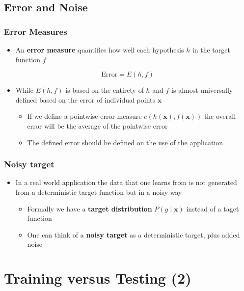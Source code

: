 \documentclass[11pt]{article}
\begin{document}
\subsection{Error and Noise}
\label{sec:orga93b44f}
\subsubsection{Error Measures}
\label{sec:orgdc1635f}
\begin{itemize}
\item An \textbf{error measure} quantifies how well each hypothesis \(h\) in the target function \(f\)
\end{itemize}
\begin{equation}
	\text{Error} = E(h,f)
\end{equation}

\begin{itemize}
\item While \(E(h,f)\) is based on the entirety of \(h\) and \(f\) is almost universally defined based on the error of individual points \(\pmb x\)
\begin{itemize}
\item If we define a pointwise error measure \(e(h(\pmb x), f(\pmb x))\) the overall error will be the average of the pointwise error
\item The defined error should be defined on the use of the application
\end{itemize}
\end{itemize}

\subsubsection{Noisy target}
\label{sec:org8f659cc}
\begin{itemize}
\item In a real world application the data that one learns from is not generated from a deterministic target function but in a noisy way
\begin{itemize}
\item Formally we have a \textbf{target distribution} \(P(y \mid \pmb x)\) instead of a taget function
\item One can think of a \textbf{noisy target} as a deterministic target, plus added noise
\end{itemize}
\end{itemize}

\section{Training versus Testing (2)}
\label{sec:org2a2baa4}
\end{document}
